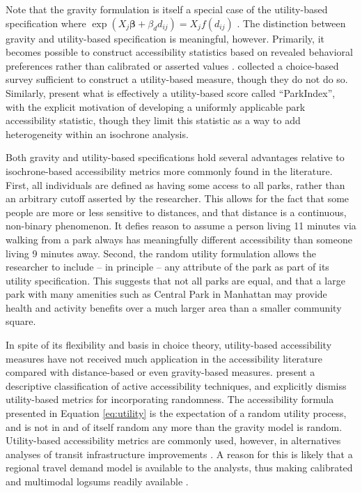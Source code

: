 \documentclass[shortAfour,sageh.bst]{sagej}
\begin{document}
Note that the gravity formulation is itself a special case of the
utility-based specification where
\(\exp(X_j\boldsymbol{\beta} + \beta_d d_{ij}) = X_j f(d_{ij})\)
\citep{Daly1982}. The distinction between gravity and utility-based
specification is meaningful, however. Primarily, it becomes possible to
construct accessibility statistics based on revealed behavioral
preferences rather than calibrated or asserted values \citep{Handy1997}.
\citet{Kinnell2006} collected a choice-based survey sufficient to
construct a utility-based measure, though they do not do so. Similarly,
\citet{Kaczynski2016} present what is effectively a utility-based score
called ``ParkIndex'', with the explicit motivation of developing a
uniformly applicable park accessibility statistic, though they limit
this statistic as a way to add heterogeneity within an isochrone
analysis.

Both gravity and utility-based specifications hold several advantages
relative to isochrone-based accessibility metrics more commonly found in
the literature. First, all individuals are defined as having some access
to all parks, rather than an arbitrary cutoff asserted by the
researcher. This allows for the fact that some people are more or less
sensitive to distances, and that distance is a continuous, non-binary
phenomenon. It defies reason to assume a person living 11 minutes via
walking from a park always has meaningfully different accessibility than
someone living 9 minutes away. Second, the random utility formulation
allows the researcher to include -- in principle -- any attribute of the
park as part of its utility specification. This suggests that not all
parks are equal, and that a large park with many amenities such as
Central Park in Manhattan may provide health and activity benefits over
a much larger area than a smaller community square.

In spite of its flexibility and basis in choice theory, utility-based
accessibility measures have not received much application in the
accessibility literature compared with distance-based or even
gravity-based measures. \citet{Vale2016} present a descriptive
classification of active accessibility techniques, and explicitly
dismiss utility-based metrics for incorporating randomness. The
accessibility formula presented in Equation \ref{eq:utility} is the
expectation of a random utility process, and is not in and of itself
random any more than the gravity model is random. Utility-based
accessibility metrics are commonly used, however, in alternatives
analyses of transit infrastructure improvements \citep{DeJong2007}. A
reason for this is likely that a regional travel demand model is
available to the analysts, thus making calibrated and multimodal logsums
readily available \citep{Geurs2010}.
\end{document}
